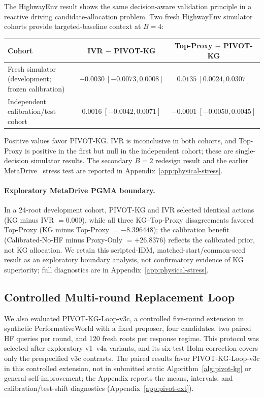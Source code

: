 \documentclass{article}
\begin{document}
The HighwayEnv result shows the same decision-aware validation principle in
a reactive driving candidate-allocation problem. Two fresh HighwayEnv
simulator cohorts provide targeted-baseline context at $B=4$:
\begin{center}
\scriptsize
\setlength{\tabcolsep}{3pt}
\begin{tabular}{@{}p{2.0in}cc@{}}
\toprule
Cohort & IVR $-$ PIVOT-KG & Top-Proxy $-$ PIVOT-KG \\
\midrule
Fresh simulator (development; frozen calibration) & $-0.0030\ [-0.0073,0.0008]$ & $0.0135\ [0.0024,0.0307]$ \\
Independent calibration/test cohort & $0.0016\ [-0.0042,0.0071]$ & $-0.0001\ [-0.0050,0.0045]$ \\
\bottomrule
\end{tabular}
\end{center}
Positive values favor PIVOT-KG. IVR is inconclusive in both cohorts, and
Top-Proxy is positive in the first but null in the independent cohort; these
are single-decision simulator results. The secondary $B=2$ redesign result
and the earlier MetaDrive~\citep{li2022metadrive} stress test are reported in
Appendix~\ref{app:physical-stress}.

\paragraph{Exploratory MetaDrive PGMA boundary.}
In a 24-root development cohort, PIVOT-KG and IVR selected identical actions
(KG minus IVR $=0.000$), while all three KG--Top-Proxy disagreements favored
Top-Proxy (KG minus Top-Proxy $=-8.396448$); the calibration benefit
(Calibrated-No-HF minus Proxy-Only $=+26.8376$) reflects the calibrated prior,
not KG allocation. We retain this scripted-IDM, matched-start/common-seed
result as an exploratory boundary analysis, not confirmatory evidence of KG
superiority; full diagnostics are in Appendix~\ref{app:physical-stress}.

\subsection{Controlled Multi-round Replacement Loop}
\label{sec:controlled-multiround}

We also evaluated PIVOT-KG-Loop-v3c, a controlled five-round extension in
synthetic PerformativeWorld with a fixed proposer, four candidates, two paired
HF queries per round, and 120 fresh roots per response regime. This protocol
was selected after exploratory v1--v4a variants, and its six-test Holm
correction covers only the prespecified v3c contrasts. The paired results
favor PIVOT-KG-Loop-v3c in this controlled extension, not in submitted static
Algorithm~\ref{alg:pivot-kg} or general self-improvement; the Appendix reports
the means, intervals, and calibration/test-shift diagnostics
(Appendix~\ref{app:pivot-ext}).
\end{document}
